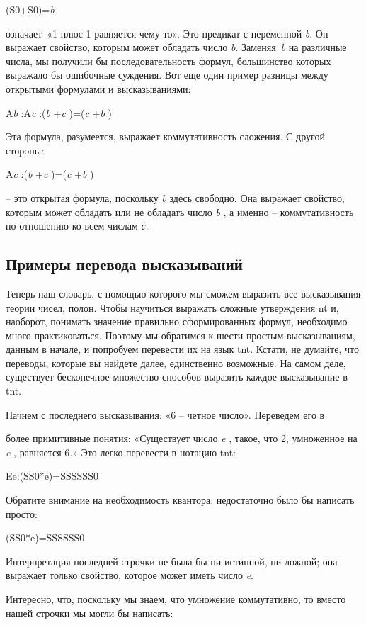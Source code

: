 \documentclass[../main.tex]{subfiles}
\begin{document}
(S0+S0)=\emph{b}

означает~«1 плюс 1 равняется чему-то». Это предикат с переменной \emph{b}. Он выражает свойство, которым может обладать число \emph{b}. Заменяя~\emph{b} на различные числа, мы получили бы последовательность формул, большинство которых выражало бы ошибочные суждения. Вот еще один пример разницы между открытыми формулами и высказываниями:

A\emph{b} :A\emph{c} :(\emph{b} +\emph{c} )=(\emph{c} +\emph{b} )

Эта формула, разумеется, выражает коммутативность сложения. С другой стороны:

A\emph{c} :(\emph{b} +\emph{c} )=(\emph{c} +\emph{b} )

\--- это открытая формула, поскольку \emph{b} здесь свободно. Она выражает свойство, которым может обладать или не обладать число \emph{b} , а именно \--- коммутативность по отношению ко всем числам \emph{с}.


\subsection{Примеры перевода высказываний}

Теперь наш словарь, с помощью которого мы сможем выразить все высказывания теории чисел, полон. Чтобы научиться выражать сложные утверждения \acs{nt} и, наоборот, понимать значение правильно сформированных формул, необходимо много практиковаться.
Поэтому мы обратимся к шести простым высказываниям, данным в начале, и попробуем перевести их на язык \acs{tnt}. Кстати, не думайте, что переводы, которые вы найдете далее, единственно возможные. На самом деле, существует бесконечное множество способов выразить каждое высказывание в \acs{tnt}.

Начнем с последнего высказывания: «6 \--- четное число». Переведем его в

более примитивные понятия: «Существует число \emph{e} , такое, что 2, умноженное на \emph{e} , равняется 6.» Это легко перевести в нотацию \acs{tnt}:

Ee:(SS0*e)=SSSSSS0

Обратите внимание на необходимость квантора; недостаточно было бы написать просто:

(SS0*e)=SSSSSS0

Интерпретация последней строчки не была бы ни истинной, ни ложной; она выражает только свойство, которое может иметь число \emph{e}.

Интересно, что, поскольку мы знаем, что умножение коммутативно, то вместо нашей строчки мы могли бы написать:
\end{document}
